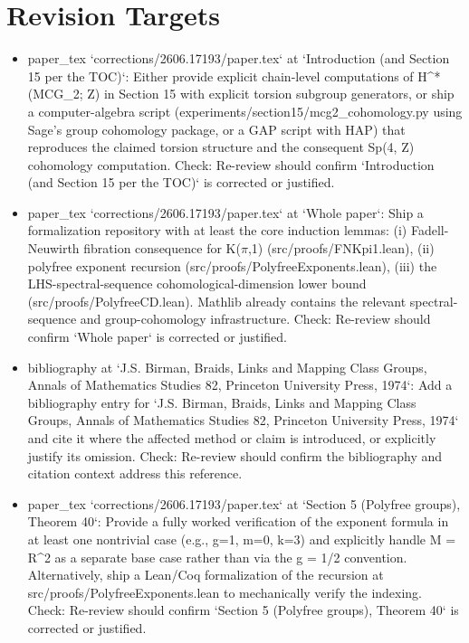 \documentclass[11pt]{article}
\begin{document}
\section*{Revision Targets}
\begin{itemize}[leftmargin=*]
  \item [open] paper\_tex `corrections/2606.17193/paper.tex` at `Introduction (and Section 15 per the TOC)`: Either provide explicit chain-level computations of H\^{}*(MCG\_2; Z) in Section 15 with explicit torsion subgroup generators, or ship a computer-algebra script (experiments/section15/mcg2\_cohomology.py using Sage's group cohomology package, or a GAP script with HAP) that reproduces the claimed torsion structure and the consequent Sp(4, Z) cohomology computation. Check: Re-review should confirm `Introduction (and Section 15 per the TOC)` is corrected or justified.
  \item [open] paper\_tex `corrections/2606.17193/paper.tex` at `Whole paper`: Ship a formalization repository with at least the core induction lemmas: (i) Fadell-Neuwirth fibration consequence for K(\ensuremath{\pi},1) (src/proofs/FNKpi1.lean), (ii) polyfree exponent recursion (src/proofs/PolyfreeExponents.lean), (iii) the LHS-spectral-sequence cohomological-dimension lower bound (src/proofs/PolyfreeCD.lean). Mathlib already contains the relevant spectral-sequence and group-cohomology infrastructure. Check: Re-review should confirm `Whole paper` is corrected or justified.
  \item [open] bibliography at `J.S. Birman, Braids, Links and Mapping Class Groups, Annals of Mathematics Studies 82, Princeton University Press, 1974`: Add a bibliography entry for `J.S. Birman, Braids, Links and Mapping Class Groups, Annals of Mathematics Studies 82, Princeton University Press, 1974` and cite it where the affected method or claim is introduced, or explicitly justify its omission. Check: Re-review should confirm the bibliography and citation context address this reference.
  \item [open] paper\_tex `corrections/2606.17193/paper.tex` at `Section 5 (Polyfree groups), Theorem 40`: Provide a fully worked verification of the exponent formula in at least one nontrivial case (e.g., g=1, m=0, k=3) and explicitly handle M = R\^{}2 as a separate base case rather than via the g = 1/2 convention. Alternatively, ship a Lean/Coq formalization of the recursion at src/proofs/PolyfreeExponents.lean to mechanically verify the indexing. Check: Re-review should confirm `Section 5 (Polyfree groups), Theorem 40` is corrected or justified.

\end{itemize}
\end{document}
